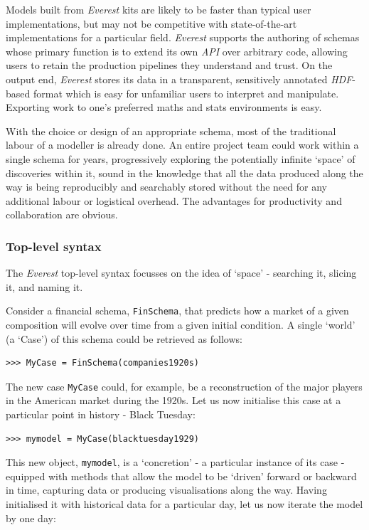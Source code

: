 \documentclass[a4paper,11pt,oneside]{book}
\begin{document}
Models built from \textit{Everest} kits are likely to be faster than typical user implementations, but may not be competitive with state-of-the-art implementations for a particular field. \textit{Everest} supports the authoring of schemas whose primary function is to extend its own \textit{API} over arbitrary code, allowing users to retain the production pipelines they understand and trust. On the output end, \textit{Everest} stores its data in a transparent, sensitively annotated \textit{HDF}-based format which is easy for unfamiliar users to interpret and manipulate. Exporting work to one's preferred maths and stats environments is easy.

With the choice or design of an appropriate schema, most of the traditional labour of a modeller is already done. An entire project team could work within a single schema for years, progressively exploring the potentially infinite `space' of discoveries within it, sound in the knowledge that all the data produced along the way is being reproducibly and searchably stored without the need for any additional labour or logistical overhead. The advantages for productivity and collaboration are obvious.

\subsubsection{Top-level syntax}

The \textit{Everest} top-level syntax focusses on the idea of `space' - searching it, slicing it, and naming it.

Consider a financial schema, \texttt{FinSchema}, that predicts how a market of a given composition will evolve over time from a given initial condition. A single `world' (a `Case') of this schema could be retrieved as follows:

\begin{verbatim}
>>> MyCase = FinSchema(companies1920s)
\end{verbatim}

The new case \texttt{MyCase} could, for example, be a reconstruction of the major players in the American market during the 1920s. Let us now initialise this case at a particular point in history - Black Tuesday:

\begin{verbatim}
>>> mymodel = MyCase(blacktuesday1929)
\end{verbatim}

This new object, \texttt{mymodel}, is a `concretion' - a particular instance of its case - equipped with methods that allow the model to be `driven' forward or backward in time, capturing data or producing visualisations along the way. Having initialised it with historical data for a particular day, let us now iterate the model by one day:
\end{document}
